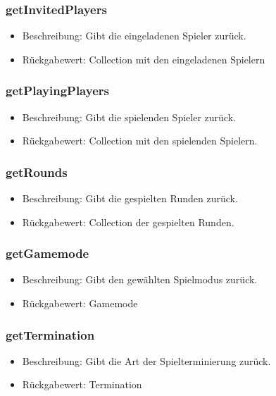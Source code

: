 \documentclass[a4paper]{scrreprt}
\begin{document}
	\subsubsection{getInvitedPlayers}
	\begin{itemize}
		\item Beschreibung: Gibt die eingeladenen Spieler zurück.
		\item Rückgabewert: Collection mit den eingeladenen Spielern
	\end{itemize}

	\subsubsection{getPlayingPlayers}
	\begin{itemize}
		\item Beschreibung: Gibt die spielenden Spieler zurück.
		\item Rückgabewert: Collection mit den spielenden Spielern.
	\end{itemize}

	\subsubsection{getRounds}
	\begin{itemize}
		\item Beschreibung: Gibt die gespielten Runden zurück.
		\item Rückgabewert: Collection der gespielten Runden.
	\end{itemize}

	\subsubsection{getGamemode}
	\begin{itemize}
		\item Beschreibung: Gibt den gewählten Spielmodus zurück.
		\item Rückgabewert: Gamemode
	\end{itemize}

	\subsubsection{getTermination}
	\begin{itemize}
		\item Beschreibung: Gibt die Art der Spielterminierung zurück.
		\item Rückgabewert: Termination
	\end{itemize}
\end{document}
